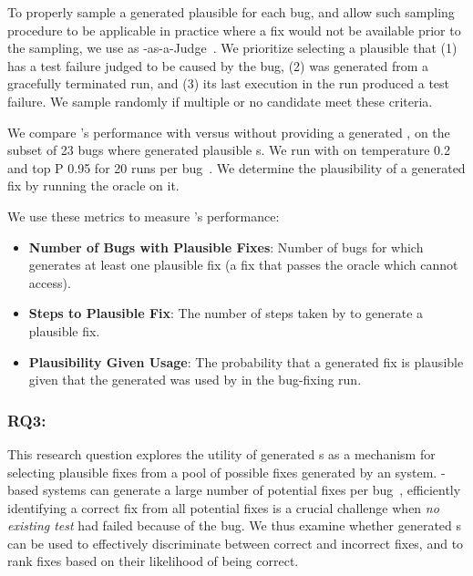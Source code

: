 To properly sample a generated plausible \brt for each bug, and allow such sampling procedure to be applicable in practice where a fix would not be available prior to the sampling, we use \gemini as \llm-as-a-Judge~\cite{zheng2023judging}.
We prioritize selecting a plausible \brt{} that (1) has a test failure judged to be caused by the bug, (2) was generated from a gracefully terminated \tool run, and (3) its last execution in the \tool run produced a test failure. 
We sample randomly if multiple or no candidate meet these criteria.


We compare \passerine's performance with versus without providing a generated \brt, on the subset of 23 bugs where \tool generated plausible \brt{}s. 
We run \passerine with \gemini on temperature 0.2 and top P 0.95 for 20 runs per bug~\cite{rondon2025passerine}. 
We determine the plausibility of a generated fix by running the oracle \brt on it.




We use these metrics to measure \passerine's performance:
\label{sec:empiricalstudy:rq3}
\begin{itemize}
    \item \textbf{Number of Bugs with Plausible Fixes}: Number of bugs for which \passerine generates at least one plausible fix (a fix that passes the oracle \brt which \passerine cannot access).
    \item \textbf{Steps to Plausible Fix}: The number of steps taken by \passerine to generate a plausible fix.
    \item \textbf{Plausibility Given \brt Usage}: The probability that a generated fix is plausible given that the generated \brt was used by \passerine in the bug-fixing run.
\end{itemize}


\subsubsection{RQ3: \rqthreetitle}

This research question explores the utility of generated \brt{}s as a mechanism for selecting plausible fixes from a pool of possible fixes generated by an \autopr system. 
\llm-based \autopr systems can generate a large number of potential fixes per bug~\cite{jiang2023impact,fan2023automated,xia2023automated,jimenez2023swe,rondon2025passerine}, efficiently identifying a correct fix from all potential fixes is a crucial challenge when \textit{no existing test} had failed because of the bug. 
We thus examine whether generated \brt{}s can be used to effectively discriminate between correct and incorrect fixes, and to rank fixes based on their likelihood of being correct. 

